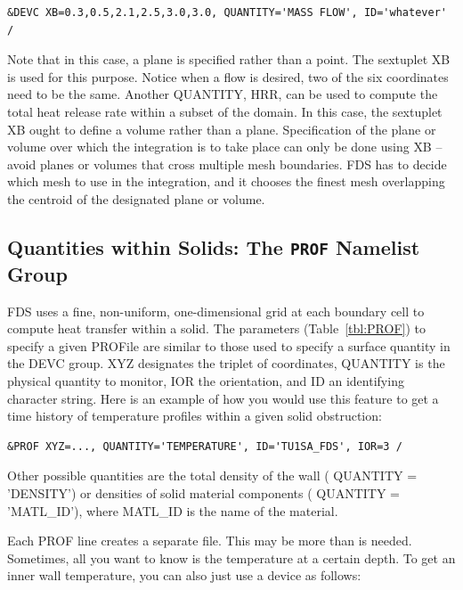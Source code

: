 \documentclass[11pt]{book}
\begin{document}
\footnotesize
\begin{verbatim}
&DEVC XB=0.3,0.5,2.1,2.5,3.0,3.0, QUANTITY='MASS FLOW', ID='whatever' /
\end{verbatim}
\normalsize

\noindent
Note that in this case, a plane is specified rather than
a point. The sextuplet {\ct XB} is used for this purpose. Notice when a
flow is desired, two of the six coordinates need to be the same. Another
{\ct QUANTITY}, {\ct HRR}, can be used to compute the total heat release
rate within a subset of the domain. In this case, the sextuplet
{\ct XB} ought to define a volume rather than a plane. Specification of
the plane or volume over which the integration is to take place can only
be done using {\ct XB} -- avoid planes or volumes
that cross multiple mesh boundaries. FDS has to decide which mesh to
use in the integration, and it chooses the finest mesh overlapping
the centroid of the designated plane or volume.




\subsection{Quantities within Solids: The \texorpdfstring{{\tt PROF}}{PROF} Namelist Group}%
\label{info:PROF}

FDS uses a fine, non-uniform, one-dimensional grid at each boundary
cell to compute heat transfer within a solid. The parameters
(Table~\ref{tbl:PROF}) to specify a given {\ct PROF}ile are similar to
those used to specify a surface quantity in the {\ct DEVC} group. {\ct
XYZ} designates the triplet of coordinates, {\ct QUANTITY} is the
physical quantity to monitor, {\ct IOR} the orientation,
and {\ct ID} an identifying character string. Here is an example of
how you would use this feature to get a time history of temperature
profiles within a given solid obstruction:

\footnotesize
\begin{verbatim}
&PROF XYZ=..., QUANTITY='TEMPERATURE', ID='TU1SA_FDS', IOR=3 /
\end{verbatim} \normalsize

\noindent
Other possible quantities are the total density of the wall ({\ct
QUANTITY = 'DENSITY'}) or densities of solid material components ({\ct
QUANTITY = 'MATL\_ID'}), where {\ct MATL\_ID} is the name of the
material.

Each {\ct PROF} line creates a separate file. This may be more than is
needed. Sometimes, all you want to know is the temperature at a
certain depth. To get an inner wall temperature, you can also just use
a device as follows:
\end{document}
